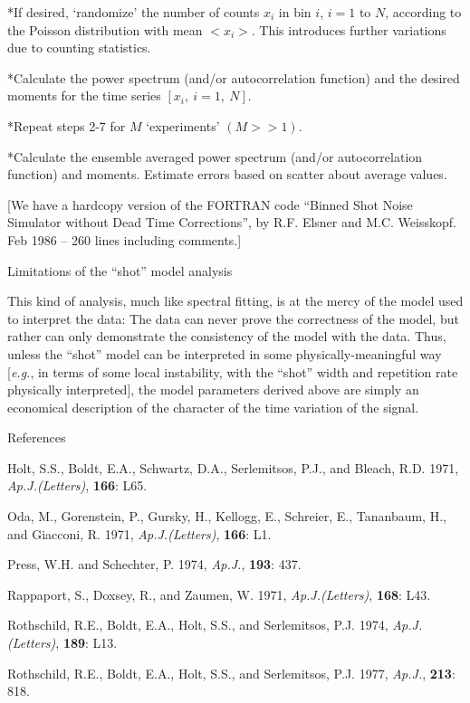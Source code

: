 \**If desired, `randomize' the number of counts $x_i$ in bin
$i$, $i = 1$ to $N$, according to the Poisson distribution with mean
$<x_{i}>$.  This introduces further variations due to counting
statistics.

\**Calculate the power spectrum (and/or autocorrelation
function) and the desired moments for the time series $[x_i,\ i=1,\
N]$.

\**Repeat steps 2-7 for $M$ `experiments' $(M>>1)$.

\**Calculate the ensemble averaged power spectrum (and/or
autocorrelation function) and moments.  Estimate errors based on
scatter about average values.

\item{}[We have a hardcopy version of the FORTRAN code ``Binned Shot
Noise Simulator without Dead Time Corrections'', by R.F. Elsner and
M.C. Weisskopf. Feb 1986 -- 260 lines including comments.]

\@{Limitations of the ``shot'' model analysis}

This kind of analysis, much like spectral fitting, is at the mercy of
the model used to interpret the data:  The data can never prove the
correctness of the model, but rather can only demonstrate the
consistency of the model with the data.  Thus, unless the ``shot''
model can be interpreted in some physically-meaningful way [{\it e.g.}, in
terms of some local instability, with the ``shot'' width and
repetition rate physically interpreted], the model parameters derived
above are simply an economical description of the character of the
time variation of the signal.

\@{References}

Holt, S.S., Boldt, E.A., Schwartz, D.A., Serlemitsos, P.J., and
Bleach, R.D. 1971, {\it Ap.J.(Letters)}, {\bf 166}: L65.

Oda, M., Gorenstein, P., Gursky, H., Kellogg, E., Schreier, E.,
Tananbaum, H., and Giacconi, R. 1971, {\it Ap.J.(Letters)}, {\bf 166}:
L1.

Press, W.H. and Schechter, P. 1974, {\it Ap.J.}, {\bf 193}: 437.

Rappaport, S., Doxsey, R., and Zaumen, W. 1971, {\it Ap.J.(Letters)},
{\bf 168}: L43.

Rothschild, R.E., Boldt, E.A., Holt, S.S., and Serlemitsos, P.J. 1974,
{\it Ap.J.(Letters)}, {\bf 189}: L13.

Rothschild, R.E., Boldt, E.A., Holt, S.S., and Serlemitsos, P.J. 1977,
{\it Ap.J.}, {\bf 213}: 818.

